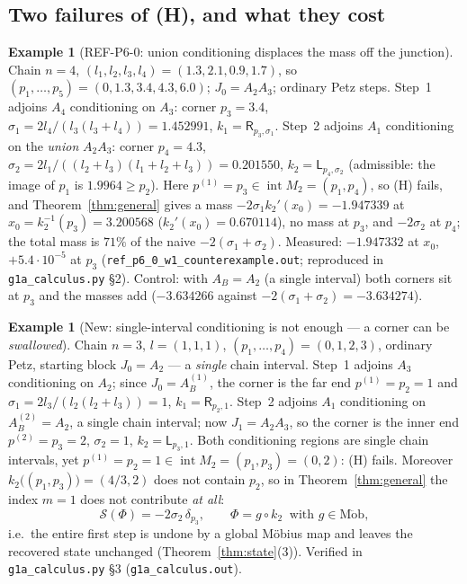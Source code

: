 \documentclass[11pt]{article}
\newcommand{\Sch}{\mathcal S}
\newcommand{\Mob}{\operatorname{M\ddot ob}}
\newcommand{\Rp}{\mathsf R}
\newcommand{\Lp}{\mathsf L}
\theoremstyle{definition}\newtheorem{example}[theorem]{Example}
\begin{document}
\subsection{Two failures of (H), and what they cost}\label{sec:failH}

\begin{example}[REF-P6-0: union conditioning displaces the mass off the
junction]\label{ex:displaced}
Chain $n=4$, $(l_1,l_2,l_3,l_4)=(1.3,2.1,0.9,1.7)$, so $(p_1,\dots,p_5)=(0,1.3,3.4,4.3,6.0)$;
$J_0=A_2A_3$; ordinary Petz steps.  Step~1 adjoins $A_4$ conditioning on $A_3$: corner $p_3=3.4$,
$\sigma_1=2l_4/(l_3(l_3+l_4))=1.452991$, $k_1=\Rp_{p_3,\sigma_1}$.  Step~2 adjoins $A_1$
conditioning on the \emph{union} $A_2A_3$: corner $p_4=4.3$,
$\sigma_2=2l_1/((l_2+l_3)(l_1+l_2+l_3))=0.201550$, $k_2=\Lp_{p_4,\sigma_2}$ (admissible: the
image of $p_1$ is $1.9964\ge p_2$).  Here $p^{(1)}=p_3\in\operatorname{int}M_2=(p_1,p_4)$, so (H)
fails, and Theorem~\ref{thm:general} gives a mass
$-2\sigma_1k_2'(x_0)=-1.947339$ at $x_0=k_2^{-1}(p_3)=3.200568$ ($k_2'(x_0)=0.670114$), no mass at
$p_3$, and $-2\sigma_2$ at $p_4$; the total mass is $71\%$ of the naive
$-2(\sigma_1+\sigma_2)$.  Measured: $-1.947332$ at $x_0$, $+5.4\cdot10^{-5}$ at $p_3$
(\texttt{ref\_p6\_0\_w1\_counterexample.out}; reproduced in \texttt{g1a\_calculus.py} \S2).
Control: with $A_B=A_2$ (a single interval) both corners sit at $p_3$ and the masses add
($-3.634266$ against $-2(\sigma_1+\sigma_2)=-3.634274$).
\end{example}

\begin{example}[New: single-interval conditioning is not enough --- a corner can be
\emph{swallowed}]\label{ex:swallow}
Chain $n=3$, $l=(1,1,1)$, $(p_1,\dots,p_4)=(0,1,2,3)$, ordinary Petz, starting block
$J_0=A_2$ --- a \emph{single} chain interval.  Step~1 adjoins $A_3$ conditioning on $A_2$; since
$J_0=A^{(1)}_B$, the corner is the far end $p^{(1)}=p_2=1$ and
$\sigma_1=2l_3/(l_2(l_2+l_3))=1$, $k_1=\Rp_{p_2,1}$.  Step~2 adjoins $A_1$ conditioning on
$A^{(2)}_B=A_2$, a single chain interval; now $J_1=A_2A_3$, so the corner is the inner end
$p^{(2)}=p_3=2$, $\sigma_2=1$, $k_2=\Lp_{p_3,1}$.  Both conditioning regions are single chain
intervals, yet $p^{(1)}=p_2=1\in\operatorname{int}M_2=(p_1,p_3)=(0,2)$: (H) fails.  Moreover
$k_2\bigl((p_1,p_3)\bigr)=(4/3,2)$ does not contain $p_2$, so in Theorem~\ref{thm:general} the
index $m=1$ does not contribute \emph{at all}:
\[
 \Sch(\Phi)=-2\sigma_2\,\delta_{p_3},\qquad \Phi=g\circ k_2\ \text{ with } g\in\Mob,
\]
i.e.\ the entire first step is undone by a global M\"obius map and leaves the recovered state
unchanged (Theorem~\ref{thm:state}(3)).  Verified in \texttt{g1a\_calculus.py} \S3
(\texttt{g1a\_calculus.out}).
\end{example}
\end{document}
